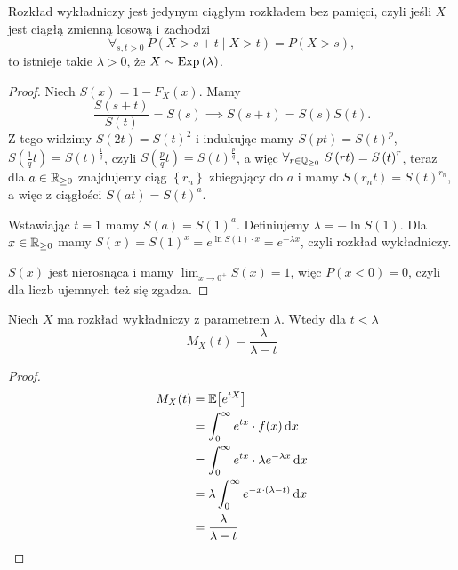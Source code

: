 \begin{theorem}
	Rozkład wykładniczy jest jedynym ciągłym rozkładem bez pamięci, czyli jeśli \(X\) jest ciągłą zmienną losową i zachodzi
	\[ \forall_{s,t>0} \ P\left( X> s+t \mid X>t \right) = P\left( X >s \right) ,  \]
	to istnieje takie \(\lambda > 0\), że \(X \sim \operatorname{Exp}\left( \lambda \right) \).
\end{theorem}
\begin{proof}
	Niech \(S\left( x  \right) = 1 - F_X\left( x  \right) \). Mamy
	\[ \frac{S\left( s+t \right) }{S\left( t \right) } = S\left( s  \right) \implies  S\left( s+t \right) = S\left( s  \right) S\left( t  \right) . \]
	Z tego widzimy \(S \left( 2t \right) = S\left( t \right)^2 \) i indukując mamy \(S\left( p t  \right) = S\left( t  \right) ^{p}\), \( S\left( \frac{1}{q}t \right) = S\left( t  \right) ^{\frac{1}{q}} \), czyli \(S\left( \frac{p}{q}t \right) = S\left( t  \right) ^{\frac{p}{q}}\), a więc \(\forall_{r \in \mathbb{Q}_{\ge 0}} \ S\left( rt \right) = S\left( t  \right) ^{r} \), teraz dla \(a\in \mathbb{R}_{\ge 0}\) znajdujemy ciąg \(\left\{ r_n \right\} \) zbiegający do \(a\) i mamy \(S\left( r_n t  \right) = S\left( t  \right) ^{r_n}\), a więc z ciągłości \(S\left( at  \right) = S\left( t  \right) ^{a}\).

	Wstawiając \(t=1\) mamy \(S\left( a  \right) = S\left( 1 \right) ^{a}\). Definiujemy \(\lambda = -\ln S\left( 1 \right) \). Dla \(x \in \mathbb{R}_{\ge 0}\) mamy \(S\left( x  \right) = S\left( 1 \right) ^{x} = e^{\ln S\left( 1 \right) \cdot  x } = e^{-\lambda x}\), czyli rozkład wykładniczy.

	\(S\left( x  \right) \) jest nierosnąca i mamy \( \lim_{x \to 0^{+}} S\left( x  \right) = 1\), więc \(P\left( x < 0 \right) = 0\), czyli dla liczb ujemnych też się zgadza.
\end{proof}


\begin{theorem}[MGF]
	Niech \( X \) ma rozkład wykładniczy z parametrem \( \lambda \). Wtedy dla \( t < \lambda \)
	\[
		M_X(t) = \frac{\lambda}{\lambda - t}
	\]
\end{theorem}
\begin{proof}
	\begin{align*}
		M_X(t)
		 & = \expected{e^{tX}}                                         \\
		 & = \int_0^\infty e^{tx} \cdot f(x) \diff x                   \\
		 & = \int_0^\infty e^{tx} \cdot \lambda e^{-\lambda x} \diff x \\
		 & = \lambda \int_0^\infty e^{-x \cdot (\lambda - t)} \diff x  \\
		 & = \frac{\lambda}{\lambda - t}
	\end{align*}
\end{proof}

